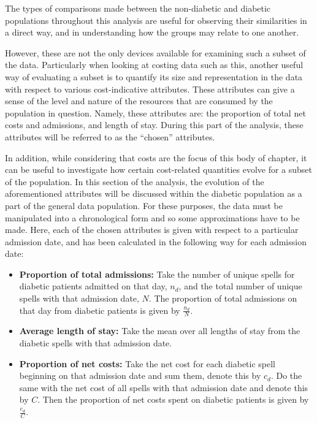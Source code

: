 The types of comparisons made between the non-diabetic and diabetic populations
throughout this analysis are useful for observing their similarities in a direct
way, and in understanding how the groups may relate to one another.

However, these are not the only devices available for examining such a subset of
the data. Particularly when looking at costing data such as this, another useful
way of evaluating a subset is to quantify its size and representation in the
data with respect to various cost-indicative attributes. These attributes can
give a sense of the level and nature of the resources that are consumed by the
population in question. Namely, these attributes are: the proportion of total
net costs and admissions, and length of stay. During this part of the analysis,
these attributes will be referred to as the ``chosen'' attributes.

In addition, while considering that costs are the focus of this body of
chapter, it can be useful to investigate how certain cost-related quantities
evolve for a subset of the population. In this section of the analysis, the
evolution of the aforementioned attributes will be discussed within the diabetic
population as a part of the general data population. For these purposes, the
data must be manipulated into a chronological form and so some approximations
have to be made. Here, each of the chosen attributes is given with respect to a
particular admission date, and has been calculated in the following way for each
admission date:

\begin{itemize}
    \item \textbf{Proportion of total admissions:} Take the number of unique
        spells for diabetic patients admitted on that day, \(n_d\), and the
        total number of unique spells with that admission date, \(N\). The
        proportion of total admissions on that day from diabetic patients is
        given by \(\frac{n_d}{N}\).
    \item \textbf{Average length of stay:} Take the mean over all lengths of
        stay from the diabetic spells with that admission date.
    \item \textbf{Proportion of net costs:} Take the net cost for each diabetic
        spell beginning on that admission date and sum them, denote this by
        \(c_d\). Do the same with the net cost of all spells with that admission
        date and denote this by \(C\). Then the proportion of net costs spent on
        diabetic patients is given by \(\frac{c_d}{C}\).
\end{itemize}

